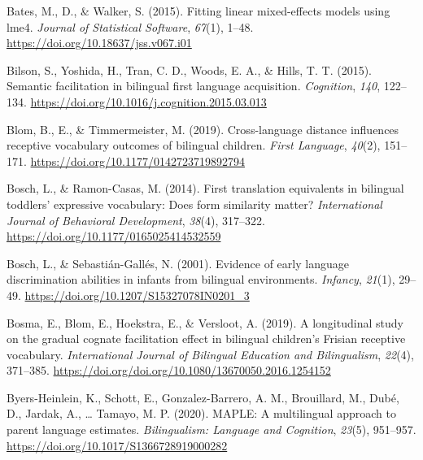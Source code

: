\documentclass[
  ,man,floatsintext]{apa6}
\newlength{\cslhangindent}
\newlength{\cslentryspacingunit} %
\newenvironment{CSLReferences}[2] %
 {%
  \setlength{\parindent}{0pt}
  \ifodd #1
  \let\oldpar\par
  \def\par{\hangindent=\cslhangindent\oldpar}
  \fi
  \setlength{\parskip}{#2\cslentryspacingunit}
 }%
 {}
\begin{document}
\hypertarget{refs}{}
\begin{CSLReferences}{1}{0}
\leavevmode{}%
Bates, M., D., \& Walker, S. (2015). Fitting linear mixed-effects models using lme4. \emph{Journal of Statistical Software}, \emph{67}(1), 1--48. \url{https://doi.org/10.18637/jss.v067.i01}

\leavevmode{}%
Bilson, S., Yoshida, H., Tran, C. D., Woods, E. A., \& Hills, T. T. (2015). Semantic facilitation in bilingual first language acquisition. \emph{Cognition}, \emph{140}, 122--134. \url{https://doi.org/10.1016/j.cognition.2015.03.013}

\leavevmode{}%
Blom, B., E., \& Timmermeister, M. (2019). Cross-language distance influences receptive vocabulary outcomes of bilingual children. \emph{First Language}, \emph{40}(2), 151--171. \url{https://doi.org/10.1177/0142723719892794}

\leavevmode{}%
Bosch, L., \& Ramon-Casas, M. (2014). First translation equivalents in bilingual toddlers' expressive vocabulary: Does form similarity matter? \emph{International Journal of Behavioral Development}, \emph{38}(4), 317--322. \url{https://doi.org/10.1177/0165025414532559}

\leavevmode{}%
Bosch, L., \& Sebastián-Gallés, N. (2001). Evidence of early language discrimination abilities in infants from bilingual environments. \emph{Infancy}, \emph{21}(1), 29--49. \url{https://doi.org/10.1207/S15327078IN0201_3}

\leavevmode{}%
Bosma, E., Blom, E., Hoekstra, E., \& Versloot, A. (2019). A longitudinal study on the gradual cognate facilitation effect in bilingual children's {F}risian receptive vocabulary. \emph{International Journal of Bilingual Education and Bilingualism}, \emph{22}(4), 371--385. \url{https://doi.org/doi.org/10.1080/13670050.2016.1254152}

\leavevmode{}%
Byers-Heinlein, K., Schott, E., Gonzalez-Barrero, A. M., Brouillard, M., Dubé, D., Jardak, A., \ldots{} Tamayo, M. P. (2020). MAPLE: A multilingual approach to parent language estimates. \emph{Bilingualism: Language and Cognition}, \emph{23}(5), 951--957. \url{https://doi.org/10.1017/S1366728919000282}


\end{CSLReferences}
\end{document}
